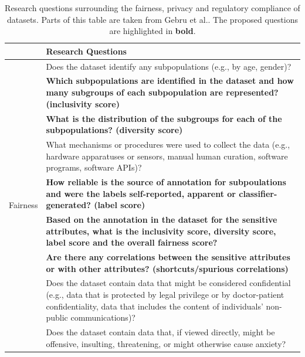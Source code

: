 \documentclass[journal]{IEEEtran}
\begin{document}
\begin{table}[]
\caption{\label{tab:newdatasheet} Research questions surrounding the fairness, privacy and regulatory compliance of datasets. Parts of this table are taken from Gebru et al.\cite{gebru2021datasheets}. The proposed questions are highlighted in \textbf{bold}.}
\centering
\begin{tabular}{|p{}|p{}|}
\hline
\multicolumn{1}{|l|}{\textbf{}} & \textbf{Research Questions}                                                                                                  \\ \hline
\multirow{11}{*}{Fairness}       & Does the dataset identify any subpopulations (e.g., by age, gender)?  \\
& \textbf{Which subpopulations are identified in the dataset and how many subgroups of each subpopulation are represented? (inclusivity score)}                                                \\
 & \textbf{What is the distribution of the subgroups for each of the subpopulations? (diversity score)}       \\
& What mechanisms or procedures were used to collect the data (e.g., hardware apparatuses or sensors, manual human curation, software programs, software APIs)? \\
& \textbf{How reliable is the source of annotation for subpoulations and were the labels self-reported, apparent or classifier-generated? (label score)} \\
& \textbf{Based on the annotation in the dataset for the sensitive attributes, what is the inclusivity score, diversity score, label score and the overall fairness score?}  \\
 & \textbf{Are there any correlations between the sensitive attributes or with other attributes? (shortcuts/spurious correlations)} \\ \hline
\multirow{5}{*}{Privacy}        & Does the dataset contain data that might be considered confidential (e.g., data that is protected by legal privilege or by doctor-patient confidentiality, data that includes the content of individuals’ non-public communications)?                                                                                                                                    \\
                                & Does the dataset contain data that, if viewed directly, might be offensive, insulting, threatening, or might otherwise cause anxiety?                                                                                                                                                                                                                                    \\

\end{tabular}
\end{table}
\end{document}
